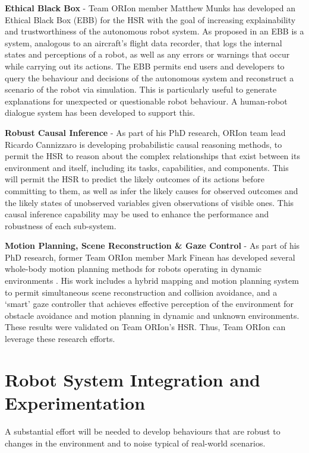 \documentclass[runningheads,a4paper]{llncs}
\newcommand{\teamori}{Team ORIon}
\begin{document}
\textbf{Ethical Black Box} - \teamori{} member Matthew Munks has developed an Ethical Black Box (EBB) for the HSR with the goal of increasing explainability and trustworthiness of the autonomous robot system. As proposed in \cite{winfield2017} an EBB is a system, analogous to an aircraft's flight data recorder, that logs the internal states and perceptions of a robot, as well as any errors or warnings that occur while carrying out its actions. The EBB permits end users and developers to query the behaviour and decisions of the autonomous system and reconstruct a scenario of the robot via simulation. This is particularly useful to generate explanations for unexpected or questionable robot behaviour. A human-robot dialogue system has been developed to support this.

\textbf{Robust Causal Inference} - As part of his PhD research, ORIon team lead Ricardo Cannizzaro is developing probabilistic causal reasoning methods, to permit the HSR to reason about the complex relationships that exist between its environment and itself, including its tasks, capabilities, and components. This will permit the HSR to predict the likely outcomes of its actions before committing to them, as well as infer the likely causes for observed outcomes and the likely states of unobserved variables given observations of visible ones. This causal inference capability may be used to enhance the performance and robustness of each sub-system.

\textbf{Motion Planning, Scene Reconstruction \& Gaze Control} - As part of his PhD research, former \teamori{} member Mark Finean has developed several whole-body motion planning methods for robots operating in dynamic environments \cite{finean2021simultaneous,finean2021i}. His work includes a hybrid mapping and motion planning system to permit simultaneous scene reconstruction and collision avoidance, and a `smart' gaze controller that achieves effective perception of the environment for obstacle avoidance and motion planning in dynamic and unknown environments. These results were validated on \teamori{}'s HSR. Thus, \teamori{} can leverage these research efforts.

\section{Robot System Integration and Experimentation}
A substantial effort will be needed to develop behaviours that are robust to
changes in the environment and to noise typical of real-world scenarios.
\end{document}
